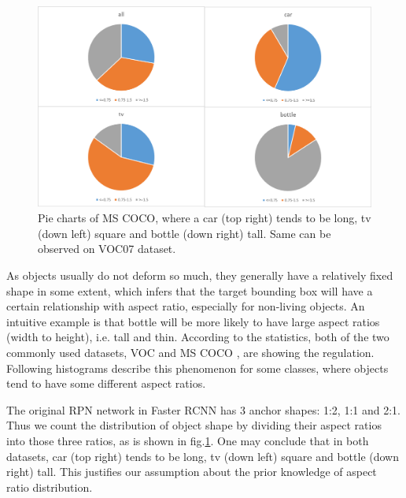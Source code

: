 \documentclass[10pt,twocolumn,letterpaper]{article}
\begin{document}
\begin{figure}[h]
\centering
\includegraphics[width=1\linewidth]{pic/dist_pics/pies_coco}
\caption{Pie charts of MS COCO\cite{coco}, where a car (top right) tends to be long, tv (down left) square and bottle (down right) tall. Same can be observed on VOC07\cite{voc07} dataset.}
\label{fig:piescoco}
\end{figure}
As objects usually do not deform so much, they generally have a relatively fixed shape in some extent, which infers that the target bounding box will have a certain relationship with aspect ratio, especially for non-living objects. An intuitive example is that bottle will be more likely to have large aspect ratios (width to height), i.e. tall and thin. According to the statistics, both of the two commonly used datasets, VOC \cite{voc07} and MS COCO \cite{coco}, are showing the regulation. Following histograms describe this phenomenon for some classes, where objects tend to have some different aspect ratios. 





The original RPN network in Faster RCNN \cite{fasterRCNN} has 3 anchor shapes: 1:2, 1:1 and 2:1. Thus we count the distribution of object shape by dividing their aspect ratios into those three ratios, as is shown in fig.\ref{fig:piescoco}. One may conclude that in both datasets, car (top right) tends to be long, tv (down left) square and bottle (down right) tall. This justifies our assumption about the prior knowledge of aspect ratio distribution.
\end{document}
